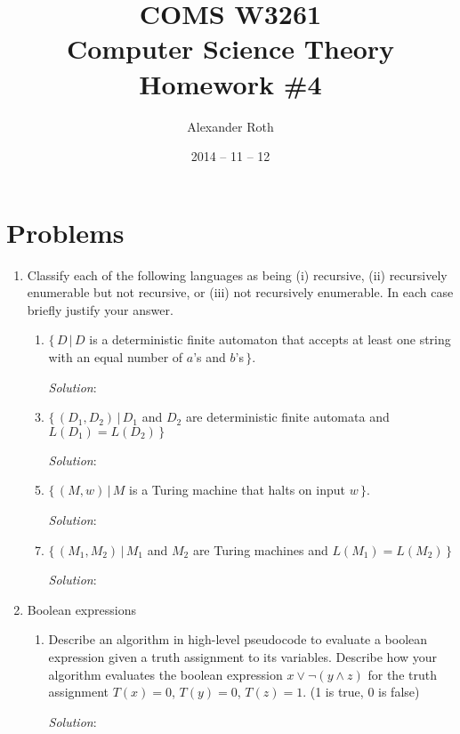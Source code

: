 \documentclass[]{article}
\begin{document}
\newtheorem{thm}{Theorem}
\title{COMS W3261 \\ Computer Science Theory \\ Homework \#4}
\author{Alexander Roth}
\date{2014 -- 11 -- 12}
\maketitle

\section*{Problems}
\begin{enumerate}
\item Classify each of the following languages as being (i) recursive, (ii)
recursively enumerable but not recursive, or (iii) not recursively enumerable.
In each case briefly justify your answer.
\begin{enumerate}
\item $\{\,D\,|\,D$ is a deterministic finite automaton that accepts at least
one string with an equal number of $a$'s and $b$'s$\,\}$.
\item[\emph{Solution}:]

\item $\{\,(D_1,D_2)\,|\,D_1$ and $D_2$ are deterministic finite automata and
$L(D_1) = L(D_2)\,\}$
\item[\emph{Solution}:]

\item $\{\,(M,w)\,|\,M$ is a Turing machine that halts on input $w\,\}$.
\item[\emph{Solution}:]

\item $\{\,(M_1,M_2)\,|\,M_1$ and $M_2$ are Turing machines and $L(M_1) =
L(M_2)\,\}$
\item[\emph{Solution}:]

\end{enumerate}

\item Boolean expressions
\begin{enumerate}
\item Describe an algorithm in high-level pseudocode to evaluate a boolean
expression given a truth assignment to its variables. Describe how your
algorithm evaluates the boolean expression $x \vee \neg(y \wedge z)$ for the
truth assignment $T(x) = 0$, $T(y) = 0$, $T(z) = 1$. (1 is true, 0 is false)
\item[\emph{Solution}:]


\end{enumerate}
\end{enumerate}
\end{document}
